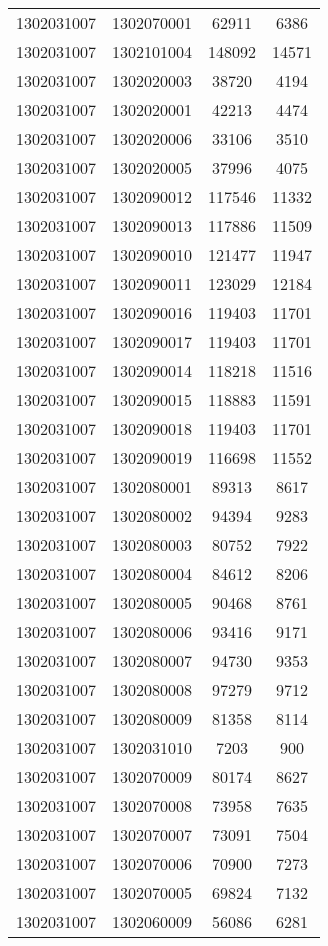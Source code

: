 \begin{longtable}{llcc}
1302031007 & 1302070001 & 62911 & 6386\\
1302031007 & 1302101004 & 148092 & 14571\\
1302031007 & 1302020003 & 38720 & 4194\\
1302031007 & 1302020001 & 42213 & 4474\\
1302031007 & 1302020006 & 33106 & 3510\\
1302031007 & 1302020005 & 37996 & 4075\\
1302031007 & 1302090012 & 117546 & 11332\\
1302031007 & 1302090013 & 117886 & 11509\\
1302031007 & 1302090010 & 121477 & 11947\\
1302031007 & 1302090011 & 123029 & 12184\\
1302031007 & 1302090016 & 119403 & 11701\\
1302031007 & 1302090017 & 119403 & 11701\\
1302031007 & 1302090014 & 118218 & 11516\\
1302031007 & 1302090015 & 118883 & 11591\\
1302031007 & 1302090018 & 119403 & 11701\\
1302031007 & 1302090019 & 116698 & 11552\\
1302031007 & 1302080001 & 89313 & 8617\\
1302031007 & 1302080002 & 94394 & 9283\\
1302031007 & 1302080003 & 80752 & 7922\\
1302031007 & 1302080004 & 84612 & 8206\\
1302031007 & 1302080005 & 90468 & 8761\\
1302031007 & 1302080006 & 93416 & 9171\\
1302031007 & 1302080007 & 94730 & 9353\\
1302031007 & 1302080008 & 97279 & 9712\\
1302031007 & 1302080009 & 81358 & 8114\\
1302031007 & 1302031010 & 7203 & 900\\
1302031007 & 1302070009 & 80174 & 8627\\
1302031007 & 1302070008 & 73958 & 7635\\
1302031007 & 1302070007 & 73091 & 7504\\
1302031007 & 1302070006 & 70900 & 7273\\
1302031007 & 1302070005 & 69824 & 7132\\
1302031007 & 1302060009 & 56086 & 6281\\

\end{longtable}
